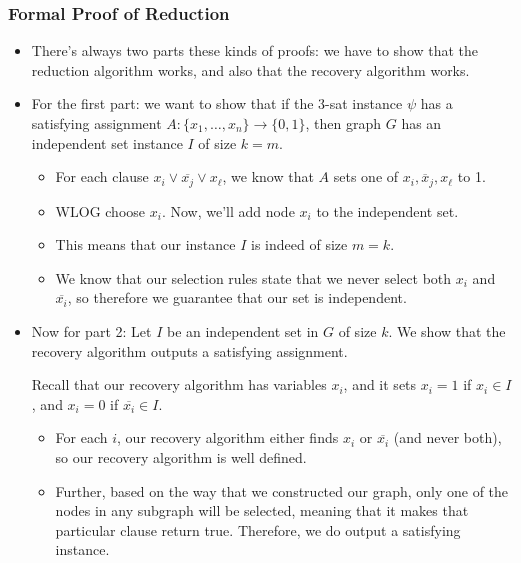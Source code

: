 \subsubsection{Formal Proof of Reduction}
\begin{itemize}
	\item There's always two parts these kinds of proofs: we have to show that the reduction algorithm works, and also 
		that the recovery algorithm works.
	\item For the first part: we want to show that if the 3-sat instance \( \psi \) has a satisfying assignment 
		\( A: \{x_1, \dots, x_n\} \to \{0, 1\}  \), then graph \( G \) has an independent 
		set instance \( I \) of size \( k = m \). 
		\begin{itemize}
			\item For each clause \( x_i \lor \overline {x_j} \lor x_\ell \), we know that \( A \) sets one of 
				\( x_i, \overline x_j, x_\ell \) to 1.
			\item WLOG choose \( x_i \). Now, we'll add node \( x_i \) to the independent set. 
			\item This means that our instance \( I \) is indeed of size \( m = k \). 


			\item We know that our selection rules state that we never select both \( x_i \) and 
				\( \overline {x_i} \), so therefore we guarantee that our set is independent.
		\end{itemize}
	\item Now for part 2: Let \( I  \) be an independent set in  \( G \) of size \( k \). We show that the 
		recovery algorithm outputs a satisfying assignment.
		
		Recall that our recovery algorithm has variables \( x_i \), and it sets \( x_i = 1 \) if 
		\( x_i \in I \), and \( x_i = 0 \) if \( \overline {x_i} \in I\). 
		\begin{itemize}
			\item For each \( i \), our recovery algorithm either finds \( x_i \) or \( \overline {x_i} \) (and 
				never both), so 
				our recovery algorithm is well defined.
			\item Further, based on the way that we constructed our graph, only one of the nodes in any 
				subgraph will be selected, meaning that it makes that particular clause return true. Therefore, 
				we do output a satisfying instance.
		\end{itemize}
\end{itemize}
